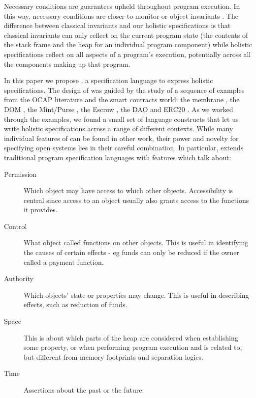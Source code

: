Necessary conditions are guarantees upheld throughout program execution.
In this way, 
necessary conditions are closer to monitor or object
invariants \cite{Hoare74,Meyer97}. The difference between 
classical invariants and our holistic specifications is that classical invariants can only reflect  on
the current program state (\ie the contents of the
stack frame and the heap for an individual program component) while
holistic specifications reflect on all aspects of a program's
execution, potentially across all the components making up that program.


In this paper we propose \Chainmail, a specification language to
express holistic specifications.
The design of \Chainmail was guided by the study of a sequence of
examples from the OCAP literature and the smart contracts world: the
membrane \cite{membranesJavascript}, the DOM \cite{dd,ddd}, the Mint/Purse \cite{MillerPhD}, the Escrow \cite{FTfJP14}, the DAO \cite{Dao, Daobug} and
ERC20 \cite{ERC20}.  As we worked through the
examples, we found a small set of language constructs that let us
write holistic specifications across a range of different contexts.
%
%
While many individual features of \Chainmail can be found in other work, 
their power and novelty for specifying open systems lies in their careful combination.
In particular, \Chainmail extends 
traditional program specification languages\cite{Leavens-etal07,Meyer92} with features which talk about:

\begin{description}
\item[Permission] Which object may have access to which other objects. 
Accessibility is central since access to an object usually also grants access to the functions it provides.

\item[Control] What object called functions on other objects. This is useful in identifying the causes of certain effects - eg 
funds can only be reduced if the owner called a payment function.

\item[Authority]  Which objects' state or properties may change. This is useful in describing effects, such as reduction of funds.

\item[Space] This is about which parts of the heap are considered when establishing some property, or when 
performing program execution and is
related to, but different from memory footprints and separation logics.

\item[Time] Assertions about the past or the future.
\end{description}


